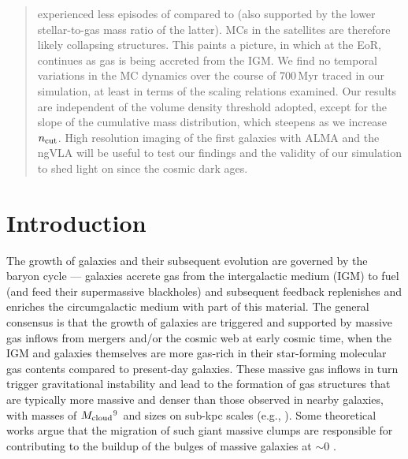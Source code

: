 \documentclass[iop]{emulateapj} %
\begin{document}
\begin{abstract}
experienced less episodes of \SF compared to \flower (also supported by the lower stellar-to-gas mass ratio of the latter).
MCs in the satellites are therefore likely collapsing structures. This paints a picture, in which at the EoR, \SF continues 
as gas is being accreted from the IGM.
We find no temporal variations in the MC dynamics over the course of 700\,Myr traced in our simulation, at least in terms of the scaling relations examined. 
Our results are independent of the volume density threshold adopted, except for the slope of the cumulative 
mass distribution, which steepens as we increase $n_{\rm cut}$. 
High resolution imaging of the first galaxies with ALMA and the ngVLA 
will be useful to test our findings and the validity of our simulation to shed
light on \SF since the cosmic dark ages.
\end{abstract}


\def\figpath{./Fig}

\section{Introduction}    \label{sec:intro}

The growth of galaxies and their subsequent evolution are governed by the baryon cycle ---
galaxies accrete gas from the intergalactic medium (IGM) to fuel \SF (and feed their supermassive blackholes)
and subsequent feedback replenishes and enriches the circumgalactic medium with part of this material.
The general consensus is that the growth of \highz galaxies are triggered and supported by massive
gas inflows from mergers and/or the cosmic web at early cosmic time, when the IGM and galaxies themselves 
are more gas-rich in their star-forming molecular
gas contents compared to present-day galaxies.
These massive gas inflows in turn trigger gravitational instability and lead
to the formation of gas structures that are typically more massive and denser than those
observed in nearby galaxies, with masses of $M_{\rm cloud}$$^9$\,\Msun
and sizes on sub-kpc scales (e.g., \citealt{Gabor13a, Hopkins14a, Inoue16a}).
Some theoretical works argue that the
migration of such giant massive clumps are responsible for contributing to the
buildup of the bulges of massive galaxies at \z$\sim$0 \citep[e.g.,][]{Ceverino10a}.
\end{document}
